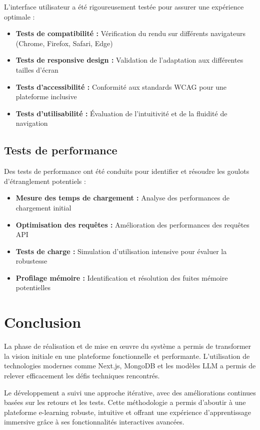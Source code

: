 L'interface utilisateur a été rigoureusement testée pour assurer une expérience optimale :

\begin{itemize}
  \item \textbf{Tests de compatibilité :} Vérification du rendu sur différents navigateurs (Chrome, Firefox, Safari, Edge)
  \item \textbf{Tests de responsive design :} Validation de l'adaptation aux différentes tailles d'écran
  \item \textbf{Tests d'accessibilité :} Conformité aux standards WCAG pour une plateforme inclusive
  \item \textbf{Tests d'utilisabilité :} Évaluation de l'intuitivité et de la fluidité de navigation
\end{itemize}

\subsection{Tests de performance}

Des tests de performance ont été conduits pour identifier et résoudre les goulots d'étranglement potentiels :

\begin{itemize}
  \item \textbf{Mesure des temps de chargement :} Analyse des performances de chargement initial
  \item \textbf{Optimisation des requêtes :} Amélioration des performances des requêtes API
  \item \textbf{Tests de charge :} Simulation d'utilisation intensive pour évaluer la robustesse
  \item \textbf{Profilage mémoire :} Identification et résolution des fuites mémoire potentielles
\end{itemize}

\section{Conclusion}

La phase de réalisation et de mise en œuvre du système a permis de transformer la vision initiale en une plateforme fonctionnelle et performante. L'utilisation de technologies modernes comme Next.js, MongoDB et les modèles LLM a permis de relever efficacement les défis techniques rencontrés.

Le développement a suivi une approche itérative, avec des améliorations continues basées sur les retours et les tests. Cette méthodologie a permis d'aboutir à une plateforme e-learning robuste, intuitive et offrant une expérience d'apprentissage immersive grâce à ses fonctionnalités interactives avancées.

